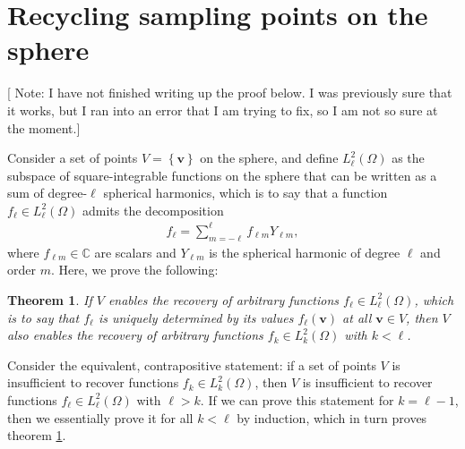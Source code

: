 \documentclass[nofootinbib,notitlepage,twocolumn]{revtex4-2}
\newcommand{\p}[1]{\left(#1\right)} %
\renewcommand{\set}[1]{\left\{#1\right\}} %
\renewcommand{\v}{\bm} %
\newcommand{\1}{\mathds{1}}
\newcommand{\CC}{\mathbb{C}}
\newtheorem{theorem}{Theorem}[section]
\newcommand{\red}[1]{{\color{red} #1}}
\begin{document}
\section{Recycling sampling points on the sphere}
\label{sec:recycle}

[\red{Note: I have not finished writing up the proof below.
  I was previously sure that it works, but I ran into an error that I am trying to fix, so I am not so sure at the moment.}]

Consider a set of points $V=\set{\v v}$ on the sphere, and define $L^2_\ell\p{\Omega}$ as the subspace of square-integrable functions on the sphere that can be written as a sum of degree-$\ell$ spherical harmonics, which is to say that a function $f_\ell\in L^2_\ell\p{\Omega}$ admits the decomposition
\begin{align}
  f_\ell = \sum_{m=-\ell}^\ell f_{\ell m} Y_{\ell m},
\end{align}
where $f_{\ell m}\in\CC$ are scalars and $Y_{\ell m}$ is the spherical harmonic of degree $\ell$ and order $m$.
Here, we prove the following:
\begin{theorem}
  If $V$ enables the recovery of arbitrary functions $f_\ell\in L^2_\ell\p{\Omega}$, which is to say that $f_\ell$ is uniquely determined by its values $f_\ell\p{\v v}$ at all $\v v\in V$, then $V$ also enables the recovery of arbitrary functions $f_k\in L^2_k\p{\Omega}$ with $k<\ell$.
  \label{thm:recycling}
\end{theorem}
Consider the equivalent, contrapositive statement: if a set of points $V$ is insufficient to recover functions $f_k\in L^2_k\p{\Omega}$, then $V$ is insufficient to recover functions $f_\ell\in L^2_\ell\p{\Omega}$ with $\ell>k$.
If we can prove this statement for $k=\ell-1$, then we essentially prove it for all $k<\ell$ by induction, which in turn proves theorem \ref{thm:recycling}.
\end{document}
